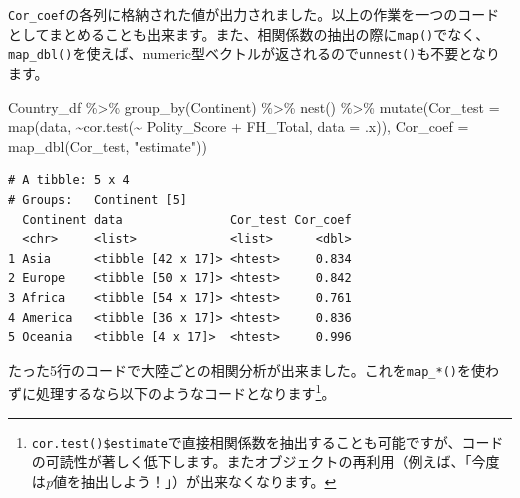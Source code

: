 \documentclass[
  a4paper,
  pandoc,
  ja=standard,
  jafont=haranoaji]{bxjsbook}
\newenvironment{Shaded}{\begin{snugshade}}{\end{snugshade}}
\newcommand{\AttributeTok}[1]{\textcolor[rgb]{0.00,0.48,0.65}{#1}}
\newcommand{\FunctionTok}[1]{\textcolor[rgb]{0.28,0.35,0.67}{#1}}
\newcommand{\NormalTok}[1]{\textcolor[rgb]{0.00,0.48,0.65}{#1}}
\newcommand{\SpecialCharTok}[1]{\textcolor[rgb]{0.37,0.37,0.37}{#1}}
\newcommand{\StringTok}[1]{\textcolor[rgb]{0.13,0.47,0.30}{#1}}
\begin{document}
\texttt{Cor\_coef}の各列に格納された値が出力されました。以上の作業を一つのコードとしてまとめることも出来ます。また、相関係数の抽出の際に\texttt{map()}でなく、\texttt{map\_dbl()}を使えば、numeric型ベクトルが返されるので\texttt{unnest()}も不要となります。

\begin{Shaded}
\begin{Highlighting}[numbers=left,,]
\NormalTok{Country\_df }\SpecialCharTok{\%\textgreater{}\%}
  \FunctionTok{group\_by}\NormalTok{(Continent) }\SpecialCharTok{\%\textgreater{}\%}
  \FunctionTok{nest}\NormalTok{() }\SpecialCharTok{\%\textgreater{}\%}
  \FunctionTok{mutate}\NormalTok{(}\AttributeTok{Cor\_test =} \FunctionTok{map}\NormalTok{(data, }\SpecialCharTok{\textasciitilde{}}\FunctionTok{cor.test}\NormalTok{(}\SpecialCharTok{\textasciitilde{}}\NormalTok{ Polity\_Score }\SpecialCharTok{+}\NormalTok{ FH\_Total, }\AttributeTok{data =}\NormalTok{ .x)),}
         \AttributeTok{Cor\_coef =} \FunctionTok{map\_dbl}\NormalTok{(Cor\_test, }\StringTok{"estimate"}\NormalTok{))}
\end{Highlighting}
\end{Shaded}

\begin{verbatim}
# A tibble: 5 x 4
# Groups:   Continent [5]
  Continent data               Cor_test Cor_coef
  <chr>     <list>             <list>      <dbl>
1 Asia      <tibble [42 x 17]> <htest>     0.834
2 Europe    <tibble [50 x 17]> <htest>     0.842
3 Africa    <tibble [54 x 17]> <htest>     0.761
4 America   <tibble [36 x 17]> <htest>     0.836
5 Oceania   <tibble [4 x 17]>  <htest>     0.996
\end{verbatim}

たった5行のコードで大陸ごとの相関分析が出来ました。これを\texttt{map\_*()}を使わずに処理するなら以下のようなコードとなります\footnote{\texttt{cor.test()\$estimate}で直接相関係数を抽出することも可能ですが、コードの可読性が著しく低下します。またオブジェクトの再利用（例えば、「今度は\emph{p}値を抽出しよう！」）が出来なくなります。}。
\end{document}
